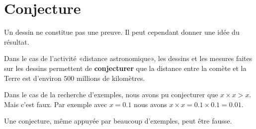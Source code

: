 
\begin{center}
   
\end{center}



\section{Conjecture}

\begin{Aretenir}
    Un dessin ne constitue pas une preuve. Il peut cependant donner une idée du résultat.
\end{Aretenir}

Dans le cas de l'activité «distance astronomique», les dessins et les mesures faites sur les dessins permettent de {\bf conjecturer} que la distance entre la comète et la Terre est d'environ \( 500\) millions de kilomètres.

Dans le cas de la recherche d'exemples, nous avons pu conjecturer que \( x\times x >x\). Mais c'est faux. Par exemple avec \( x=0.1\) nous avons \( x\times x=0.1\times 0.1=0.01\).

\begin{Aretenir}
    Une conjecture, même appuyée par beaucoup d'exemples, peut être fausse.
\end{Aretenir}


